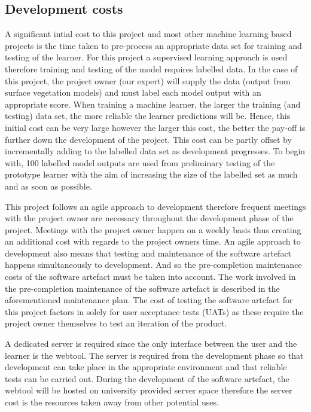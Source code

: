 \documentclass[11pt]{article} %
\numberwithin{equation}{section}
\begin{document}
\subsection{Development costs}
\quad A significant intial cost to this project and most other machine learning based projects is the time taken to pre-process an appropriate data set for training and testing of the learner. For this project a supervised learning approach is used therefore training and testing of the model requires labelled data. In the case of this project, the project owner (our expert) will supply the data (output from surface vegetation models) and must label each model output with an appropriate score. When training a machine learner, the larger the training (and testing) data set, the more reliable the learner predictions will be. Hence, this initial cost can be very large however the larger this cost, the better the pay-off is further down the development of the project. This cost can be partly offset by incrementally adding to the labelled data set as development progresses. To begin with, 100 labelled model outputs are used from preliminary testing of the prototype learner with the aim of increasing the size of the labelled set as much and as soon as possible.\par

\quad This project follows an agile approach to development therefore frequent meetings with the project owner are necessary throughout the development phase of the project. Meetings with the project owner happen on a weekly basis thus creating an additional cost with regards to the project owners time. An agile approach to development also means that testing and maintenance of the software artefact happens simultaneously to development. And so the pre-completion maintenance costs of the software artefact must be taken into account. The work involved in the pre-completion maintenance of the software artefact is described in the aforementioned maintenance plan. The cost of testing the software artefact for this project factors in solely for user acceptance tests (UATs) as these require the project owner themselves to test an iteration of the product.\par

\quad A dedicated server is required since the only interface between the user and the learner is the webtool. The server is required from the development phase so that development can take place in the appropriate environment and that reliable tests can be carried out. During the development of the software artefact, the webtool will be hosted on university provided server space therefore the server cost is the resources taken away from other potential uses.\par
\end{document}

